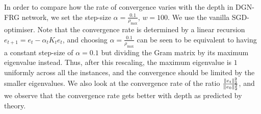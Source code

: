 In order to compare how the rate of convergence varies with the depth in DGN-FRG network, we set the step-size $\alpha=\frac{0.1}{\rho_{\max}}$, $w=100$. We use the vanilla SGD-optimiser. Note that the convergence rate is determined by a linear recursion $e_{t+1}=e_t-\alpha_t K_te_t$, and choosing $\alpha=\frac{0.1}{\rho_{\max}}$ can be seen to be equivalent to having a constant step-size of $\alpha=0.1$ but dividing the Gram matrix by its maximum eigenvalue instead. Thus, after this rescaling, the maximum eigenvalue is $1$ uniformly across all the instances, and the convergence should be limited by the smaller eigenvalues. We also look at the convergence rate of the ratio $\frac{\|e_t\|^2_2}{\|e_0\|^2_2}$, and we observe that the convergence rate gets better with depth as predicted by theory.


